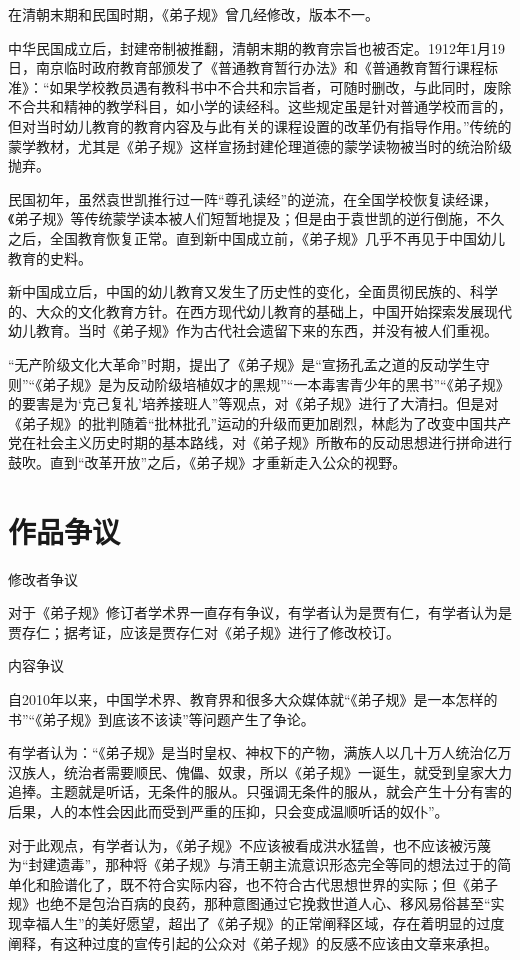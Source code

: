 \documentclass[a4paper,12pt,UTF8,twoside]{ctexbook}
\begin{document}
在清朝末期和民国时期，《弟子规》曾几经修改，版本不一。

中华民国成立后，封建帝制被推翻，清朝末期的教育宗旨也被否定。1912年1月19日，南京临时政府教育部颁发了《普通教育暂行办法》和《普通教育暂行课程标准》：“如果学校教员遇有教科书中不合共和宗旨者，可随时删改，与此同时，废除不合共和精神的教学科目，如小学的读经科。这些规定虽是针对普通学校而言的，但对当时幼儿教育的教育内容及与此有关的课程设置的改革仍有指导作用。”传统的蒙学教材，尤其是《弟子规》这样宣扬封建伦理道德的蒙学读物被当时的统治阶级抛弃。

民国初年，虽然袁世凯推行过一阵“尊孔读经”的逆流，在全国学校恢复读经课，《弟子规》等传统蒙学读本被人们短暂地提及；但是由于袁世凯的逆行倒施，不久之后，全国教育恢复正常。直到新中国成立前，《弟子规》几乎不再见于中国幼儿教育的史料。

新中国成立后，中国的幼儿教育又发生了历史性的变化，全面贯彻民族的、科学的、大众的文化教育方针。在西方现代幼儿教育的基础上，中国开始探索发展现代幼儿教育。当时《弟子规》作为古代社会遗留下来的东西，并没有被人们重视。

“无产阶级文化大革命”时期，提出了《弟子规》是“宣扬孔孟之道的反动学生守则”“《弟子规》是为反动阶级培植奴才的黑规”“一本毒害青少年的黑书”“《弟子规》的要害是为‘克己复礼’培养接班人”等观点，对《弟子规》进行了大清扫。但是对《弟子规》的批判随着“批林批孔”运动的升级而更加剧烈，林彪为了改变中国共产党在社会主义历史时期的基本路线，对《弟子规》所散布的反动思想进行拼命进行鼓吹。直到“改革开放”之后，《弟子规》才重新走入公众的视野。

\chapter{作品争议}
修改者争议

对于《弟子规》修订者学术界一直存有争议，有学者认为是贾有仁，有学者认为是贾存仁；据考证，应该是贾存仁对《弟子规》进行了修改校订。

内容争议

自2010年以来，中国学术界、教育界和很多大众媒体就“《弟子规》是一本怎样的书”“《弟子规》到底该不该读”等问题产生了争论。

有学者认为：“《弟子规》是当时皇权、神权下的产物，满族人以几十万人统治亿万汉族人，统治者需要顺民、傀儡、奴隶，所以《弟子规》一诞生，就受到皇家大力追捧。主题就是听话，无条件的服从。只强调无条件的服从，就会产生十分有害的后果，人的本性会因此而受到严重的压抑，只会变成温顺听话的奴仆”。

对于此观点，有学者认为，《弟子规》不应该被看成洪水猛兽，也不应该被污蔑为“封建遗毒”，那种将《弟子规》与清王朝主流意识形态完全等同的想法过于的简单化和脸谱化了，既不符合实际内容，也不符合古代思想世界的实际；但《弟子规》也绝不是包治百病的良药，那种意图通过它挽救世道人心、移风易俗甚至“实现幸福人生”的美好愿望，超出了《弟子规》的正常阐释区域，存在着明显的过度阐释，有这种过度的宣传引起的公众对《弟子规》的反感不应该由文章来承担。
\end{document}

